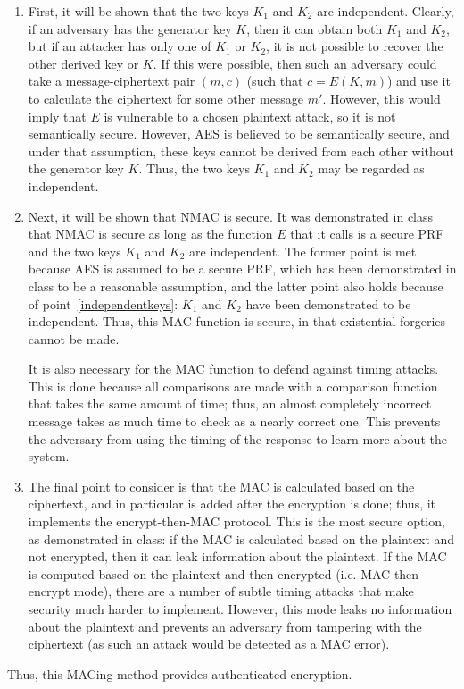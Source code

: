 \documentclass{amsart}
\begin{document}
\begin{enumerate}
\item\label{independentkeys} First, it will be shown that the two keys $K_1$ and $K_2$ are independent. Clearly, if an adversary has the generator key $K$, then it can obtain both $K_1$ and $K_2$, but if an attacker has only one of $K_1$ or $K_2$, it is not possible to recover the other derived key or $K$. If this were possible, then such an adversary could take a message-ciphertext pair $(m,c)$ (such that $c = E(K,m)$) and use it to calculate the ciphertext for some other message $m'$. However, this would imply that $E$ is vulnerable to a chosen plaintext attack, so it is not semantically secure. However, AES is believed to be semantically secure, and under that assumption, these keys cannot be derived from each other without the generator key $K$. Thus, the two keys $K_1$ and $K_2$ may be regarded as independent.
\item Next, it will be shown that NMAC is secure. It was demonstrated in class that NMAC is secure as long as the function $E$ that it calls is a secure PRF and the two keys $K_1$ and $K_2$ are independent. The former point is met because AES is assumed to be a secure PRF, which has been demonstrated in class to be a reasonable assumption, and the latter point also holds because of point~\ref{independentkeys}: $K_1$ and $K_2$ have been demonstrated to be independent. Thus, this MAC function is secure, in that existential forgeries cannot be made.

  It is also necessary for the MAC function to defend against timing attacks. This is done because all comparisons are made with a comparison function that takes the same amount of time; thus, an almost completely incorrect message takes as much time to check as a nearly correct one. This prevents the adversary from using the timing of the response to learn more about the system.
\item The final point to consider is that the MAC is calculated based on the ciphertext, and in particular is added after the encryption is done; thus, it implements the encrypt-then-MAC protocol. This is the most secure option, as demonstrated in class: if the MAC is calculated based on the plaintext and not encrypted, then it can leak information about the plaintext. If the MAC is computed based on the plaintext and then encrypted (i.e. MAC-then-encrypt mode), there are a number of subtle timing attacks that make security much harder to implement. However, this mode leaks no information about the plaintext and prevents an adversary from tampering with the ciphertext (as such an attack would be detected as a MAC error).
\end{enumerate}
Thus, this MACing method provides authenticated encryption.
\end{document}
